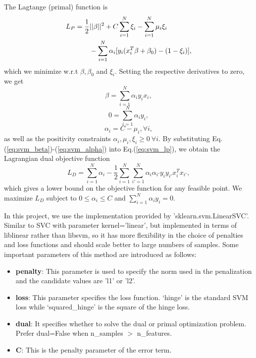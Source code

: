 \documentclass[10pt,journal,compsoc]{IEEEtran}
\begin{document}
The Lagtange (primal) function is
\begin{align}
  \label{eq:svm_lp}
  L_P = \frac{1}{2}&||\beta||^2 + C\sum_{i=1}^N\xi_i - \sum_{i=1}^N\mu_i\xi_i \\
  &- \sum_{i=1}^N\alpha_i[y_i(x_i^T\beta + \beta_0) - (1 - \xi_i)], \notag
\end{align}
which we minimize w.r.t $\beta, \beta_0$ and $\xi_i$. Setting the respective derivatives to zero, we get
\begin{equation}
  \label{eq:svm_beta}
  \beta = \sum_{i=1}^N\alpha_i y_i x_i,
\end{equation}
\begin{equation}
  \label{eq:svm_0}
  0 = \sum_{i=1}^N\alpha_i y_i,
\end{equation}
\begin{equation}
  \label{eq:svm_alpha}
  \alpha_i = C - \mu_i, \forall i,
\end{equation}
as well as the positivity constraints $\alpha_i, \mu_i, \xi_i \geq 0\ \forall i$. By substituting Eq.(\ref{eq:svm_beta})-(\ref{eq:svm_alpha}) into Eq.(\ref{eq:svm_lp}), we obtain the Lagrangian dual objective function
\begin{equation}
  L_D = \sum_{i=1}^N\alpha_i - \frac{1}{2}\sum_{i=1}^N\sum_{i'=1}^N\alpha_i\alpha_{i'}y_iy_{i'}x_i^Tx_{i'},
\end{equation}
which gives a lower bound on the objective function for any feasible point. We maximize $L_D$ subject to $0 \leq \alpha_i \leq C$ and $\sum_{i=1}^N\alpha_iy_i = 0$. 

In this project, we use the implementation provided by 'sklearn.svm.LinearSVC'. Similar to SVC with parameter kernel=’linear’, but implemented in terms of liblinear rather than libsvm, so it has more flexibility in the choice of penalties and loss functions and should scale better to large numbers of samples. Some important parameters of this method are introduced as follows:
\begin{itemize}
  \item \textbf{penalty}: This parameter is used to specify the norm used in the penalization and the candidate values are 'l1' or 'l2'.
  \item \textbf{loss}: This parameter specifies the loss function. ‘hinge’ is the standard SVM loss while ‘squared\_hinge’ is the square of the hinge loss.
  \item \textbf{dual}: It specifies whether to solve the dual or primal optimization problem. Prefer dual=False when n\_samples $>$ n\_features.
  \item \textbf{C}: This is the penalty parameter of the error term.
\end{itemize}
\end{document}

